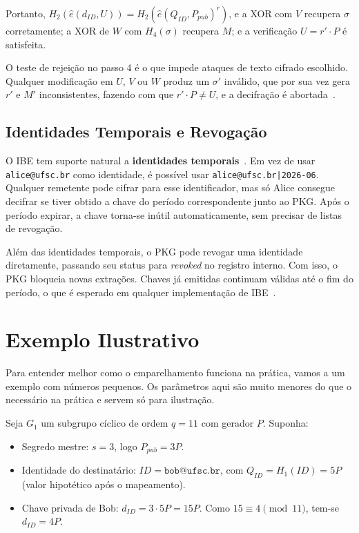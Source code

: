 Portanto, $H_2(\hat{e}(d_{\mathit{ID}}, U)) = H_2(\hat{e}(Q_{\mathit{ID}},
P_{\mathit{pub}})^r)$, e a XOR com $V$ recupera $\sigma$ corretamente; a XOR de $W$ com
$H_4(\sigma)$ recupera $M$; e a verificação $U = r' \cdot P$ é satisfeita.

O teste de rejeição no passo 4 é o que impede ataques de texto cifrado escolhido. Qualquer
modificação em $U$, $V$ ou $W$ produz um $\sigma'$ inválido, que por sua vez gera $r'$ e $M'$
inconsistentes, fazendo com que $r' \cdot P \neq U$, e a decifração é
abortada~\cite{boneh2001ibe}.

\subsection{Identidades Temporais e Revogação}

O IBE tem suporte natural a \textbf{identidades temporais}~\cite{franklin2008nist}. Em vez de
usar \texttt{alice@ufsc.br} como identidade, é possível usar \texttt{alice@ufsc.br|2026-06}.
Qualquer remetente pode cifrar para esse identificador, mas só Alice consegue decifrar se tiver
obtido a chave do período correspondente junto ao PKG. Após o período expirar, a chave torna-se
inútil automaticamente, sem precisar de listas de revogação.

Além das identidades temporais, o PKG pode revogar uma identidade diretamente, passando seu
status para \textit{revoked} no registro interno. Com isso, o PKG bloqueia novas extrações.
Chaves já emitidas continuam válidas até o fim do período, o que é esperado em qualquer
implementação de IBE~\cite{franklin2008nist}.


\section{Exemplo Ilustrativo}
\label{sec:exemplo}

Para entender melhor como o emparelhamento funciona na prática, vamos a um exemplo com
números pequenos. Os parâmetros aqui são muito menores do que o necessário na prática e servem
só para ilustração.

Seja $G_1$ um subgrupo cíclico de ordem $q = 11$ com gerador $P$. Suponha:
\begin{itemize}
  \item Segredo mestre: $s = 3$, logo $P_{\mathit{pub}} = 3P$.
  \item Identidade do destinatário: $\mathit{ID} = \texttt{bob@ufsc.br}$, com
        $Q_{\mathit{ID}} = H_1(\mathit{ID}) = 5P$ (valor hipotético após o mapeamento).
  \item Chave privada de Bob: $d_{\mathit{ID}} = 3 \cdot 5P = 15P$.
        Como $15 \equiv 4 \pmod{11}$, tem-se $d_{\mathit{ID}} = 4P$.
\end{itemize}

